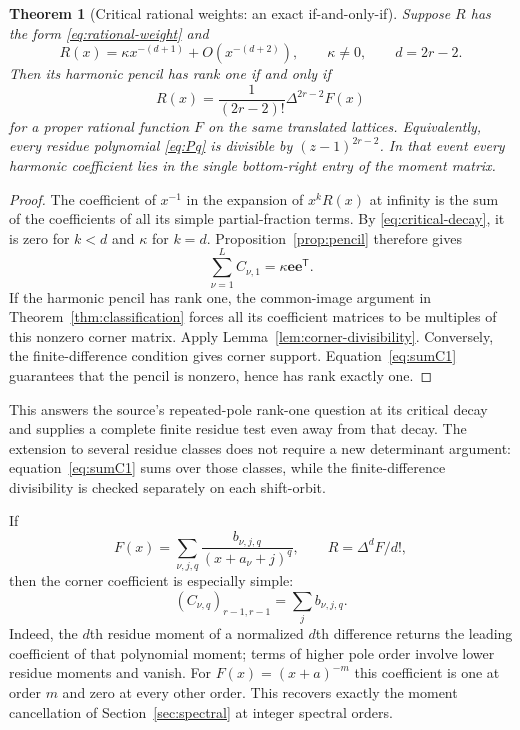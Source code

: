 \documentclass[11pt,letterpaper]{article}
\numberwithin{equation}{section}
\newtheorem{theorem}{Theorem}[section]
\theoremstyle{definition}\newtheorem{definition}[theorem]{Definition}
\theoremstyle{remark}\newtheorem{remark}[theorem]{Remark}
\newcommand{\ee}{\bm e}
\begin{document}
\begin{theorem}[Critical rational weights: an exact if-and-only-if]
\label{thm:critical}
Suppose $R$ has the form \eqref{eq:rational-weight} and
\begin{equation}\label{eq:critical-decay}
 R(x)=\kappa x^{-(d+1)}+O(x^{-(d+2)}),\qquad\kappa\ne0,
 \qquad d=2r-2.
\end{equation}
Then its harmonic pencil has rank one if and only if
\begin{equation}\label{eq:critical-difference}
 \boxed{\displaystyle R(x)=\frac1{(2r-2)!}\Delta^{2r-2}F(x)}
\end{equation}
for a proper rational function $F$ on the same translated lattices.
Equivalently, every residue polynomial \eqref{eq:Pq} is divisible
by $(z-1)^{2r-2}$. In that event every harmonic coefficient lies in
the single bottom-right entry of the moment matrix.
\end{theorem}
\begin{proof}
The coefficient of $x^{-1}$ in the expansion of $x^kR(x)$ at infinity
is the sum of the coefficients of all its simple partial-fraction
terms. By \eqref{eq:critical-decay}, it is zero for $k<d$ and
$\kappa$ for $k=d$. Proposition~\ref{prop:pencil} therefore gives
\begin{equation}\label{eq:sumC1}
 \sum_{\nu=1}^L C_{\nu,1}=\kappa\ee\ee^{\mathsf T}.
\end{equation}
If the harmonic pencil has rank one, the common-image argument in
Theorem~\ref{thm:classification} forces all its coefficient matrices
to be multiples of this nonzero corner matrix. Apply
Lemma~\ref{lem:corner-divisibility}. Conversely, the finite-difference
condition gives corner support. Equation~\eqref{eq:sumC1} guarantees
that the pencil is nonzero, hence has rank exactly one.
\end{proof}

This answers the source's repeated-pole rank-one question at its
critical decay and supplies a complete finite residue test even away
from that decay. The extension to several residue classes does not
require a new determinant argument: equation~\eqref{eq:sumC1} sums
over those classes, while the finite-difference divisibility is checked
separately on each shift-orbit.

If
\[
 F(x)=\sum_{\nu,j,q}\frac{b_{\nu,j,q}}{(x+a_\nu+j)^q},
 \qquad R=\Delta^dF/d!,
\]
then the corner coefficient is especially simple:
\begin{equation}\label{eq:lambda-seed}
 (C_{\nu,q})_{r-1,r-1}=\sum_j b_{\nu,j,q}.
\end{equation}
Indeed, the $d$th residue moment of a normalized $d$th difference
returns the leading coefficient of that polynomial moment; terms
of higher pole order involve lower residue moments and vanish.
For $F(x)=(x+a)^{-m}$ this coefficient is one at order $m$ and zero
at every other order. This recovers exactly the moment cancellation
of Section~\ref{sec:spectral} at integer spectral orders.
\end{document}
